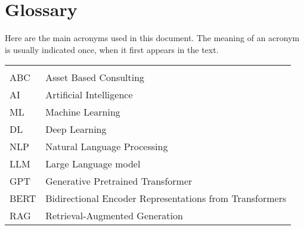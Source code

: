 \chapter*{Glossary}

Here are the main acronyms used in this document. The meaning of an acronym is usually indicated once, when it first appears in the text.

\begin{longtable}{lp{9cm}}
         &                                                         \\
    ABC  & Asset Based Consulting                                  \\
    AI   & Artificial Intelligence                                 \\
    ML   & Machine Learning                                        \\
    DL   & Deep Learning                                           \\
    NLP  & Natural Language Processing                             \\
    LLM  & Large Language model                                    \\
    GPT  & Generative Pretrained Transformer                       \\
    BERT & Bidirectional Encoder Representations from Transformers \\
    RAG  & Retrieval-Augmented Generation                          \\
\end{longtable}
